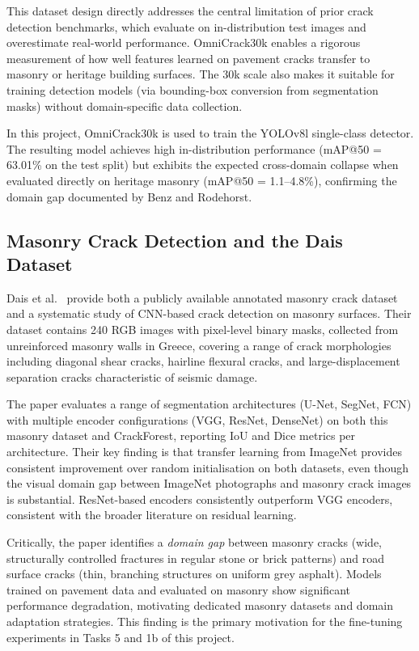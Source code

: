 \documentclass[12pt,a4paper]{article}
\begin{document}
This dataset design directly addresses the central limitation of prior crack detection benchmarks, which evaluate on in-distribution test images and overestimate real-world performance. OmniCrack30k enables a rigorous measurement of how well features learned on pavement cracks transfer to masonry or heritage building surfaces. The 30k scale also makes it suitable for training detection models (via bounding-box conversion from segmentation masks) without domain-specific data collection.

In this project, OmniCrack30k is used to train the YOLOv8l single-class detector. The resulting model achieves high in-distribution performance (mAP@50 = 63.01\% on the test split) but exhibits the expected cross-domain collapse when evaluated directly on heritage masonry (mAP@50 = 1.1--4.8\%), confirming the domain gap documented by Benz and Rodehorst.

\subsection{Masonry Crack Detection and the Dais Dataset}

Dais et al.~\cite{surv:dais2021crack} provide both a publicly available annotated masonry crack dataset and a systematic study of CNN-based crack detection on masonry surfaces. Their dataset contains 240 RGB images with pixel-level binary masks, collected from unreinforced masonry walls in Greece, covering a range of crack morphologies including diagonal shear cracks, hairline flexural cracks, and large-displacement separation cracks characteristic of seismic damage.

The paper evaluates a range of segmentation architectures (U-Net, SegNet, FCN) with multiple encoder configurations (VGG, ResNet, DenseNet) on both this masonry dataset and CrackForest, reporting IoU and Dice metrics per architecture. Their key finding is that transfer learning from ImageNet provides consistent improvement over random initialisation on both datasets, even though the visual domain gap between ImageNet photographs and masonry crack images is substantial. ResNet-based encoders consistently outperform VGG encoders, consistent with the broader literature on residual learning.

Critically, the paper identifies a \textit{domain gap} between masonry cracks (wide, structurally controlled fractures in regular stone or brick patterns) and road surface cracks (thin, branching structures on uniform grey asphalt). Models trained on pavement data and evaluated on masonry show significant performance degradation, motivating dedicated masonry datasets and domain adaptation strategies. This finding is the primary motivation for the fine-tuning experiments in Tasks 5 and 1b of this project.
\end{document}
